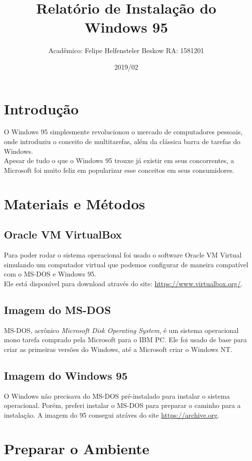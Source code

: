 \documentclass{report}
\title{Relatório de Instalação do Windows 95}
\author{Acadêmico: Felipe Helfensteler Beskow RA: 1581201}
\date{2019/02}
\begin{document}
\maketitle

\chapter{Introdução}
O Windows 95 simplesmente revolucionou o mercado de computadores pessoais, onde introduziu o conceito de multitarefas, além da clássica barra de tarefas do Windows.\\
Apesar de tudo o que o Windows 95 trouxe já existir em seus concorrentes, a Microsoft foi muito feliz em popularizar esse conceitos em seus consumidores.


\chapter{Materiais e Métodos}

\section{Oracle VM VirtualBox}
Para poder rodar o sistema operacional foi usado o software Oracle VM Virtual simulando um computador virtual que podemos configurar de maneira compatível com o MS-DOS e Windows 95.\\
Ele está disponível para download através do site: \url{https://www.virtualbox.org/}.

\section{Imagem do MS-DOS}
MS-DOS, acrônico \textit{Microsoft Disk Operating System}, é um sistema operacional mono tarefa comprado pela Microsoft para o IBM PC. Ele foi usado de base para criar as primeiras versões do Windows, até a Microsoft criar o Windows NT.

\section{Imagem do Windows 95}
O Windows não precisava do MS-DOS pré-instalado para instalar o sistema operacional. Porém, preferi instalar o MS-DOS para preparar o caminho para a instalação. A imagem do 95 consegui atráves do site \url{https://archive.org}.

\chapter{Preparar o Ambiente}
\end{document}
